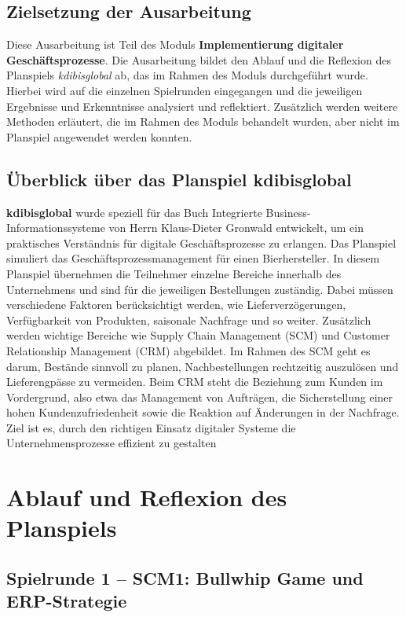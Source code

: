 \documentclass[a4paper,12pt]{article}
\begin{document}
\subsection{Zielsetzung der Ausarbeitung}
Diese Ausarbeitung ist Teil des Moduls \textbf{Implementierung digitaler Geschäftsprozesse}.
Die Ausarbeitung bildet den Ablauf und die Reflexion des Planspiels \textit{kdibisglobal} ab,
das im Rahmen des Moduls durchgeführt wurde. Hierbei wird auf die einzelnen Spielrunden eingegangen
und die jeweiligen Ergebnisse und Erkenntnisse analysiert und reflektiert. Zusätzlich werden weitere Methoden
erläutert, die im Rahmen des Moduls behandelt wurden, aber nicht im Planspiel angewendet werden konnten.

\subsection{Überblick über das Planspiel kdibisglobal}
\textbf{kdibisglobal} wurde speziell für das Buch Integrierte Business-Informationssysteme von Herrn Klaus-Dieter Gronwald entwickelt,
um ein praktisches Verständnis für digitale Geschäftsprozesse zu erlangen.
Das Planspiel simuliert das Geschäftsprozessmanagement für einen Bierhersteller. 
In diesem Planspiel übernehmen die Teilnehmer einzelne Bereiche innerhalb des Unternehmens und sind für die jeweiligen Bestellungen zuständig. 
Dabei müssen verschiedene Faktoren berücksichtigt werden, wie Lieferverzögerungen, Verfügbarkeit von Produkten, saisonale Nachfrage und so weiter.
Zusätzlich werden wichtige Bereiche wie Supply Chain Management (SCM) und Customer Relationship Management (CRM) abgebildet.
Im Rahmen des SCM geht es darum, Bestände sinnvoll zu planen, Nachbestellungen rechtzeitig auszulösen und Lieferengpässe zu vermeiden.
Beim CRM steht die Beziehung zum Kunden im Vordergrund, also etwa das Management von Aufträgen,
die Sicherstellung einer hohen Kundenzufriedenheit sowie die Reaktion auf Änderungen in der Nachfrage.
Ziel ist es, durch den richtigen Einsatz digitaler Systeme die Unternehmensprozesse effizient zu gestalten \cite{Kdibisglobal2025}

\section{Ablauf und Reflexion des Planspiels}

\subsection{Spielrunde 1 – SCM1: Bullwhip Game und ERP-Strategie}
\end{document}

